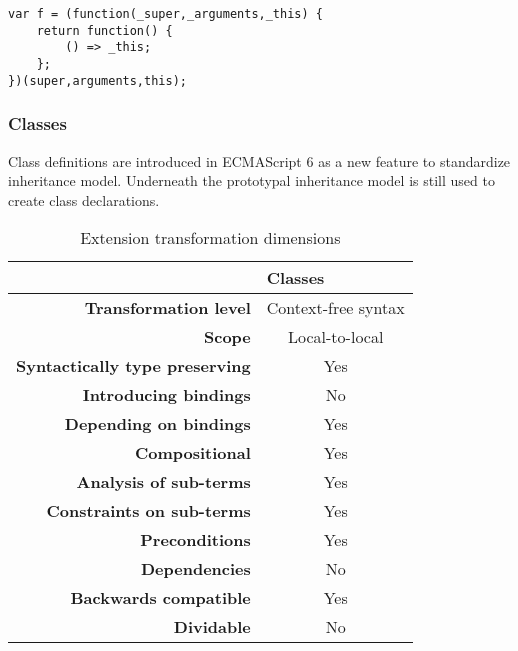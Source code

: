 \documentclass[10pt,a4paper]{article}
\begin{document}
\begin{lstlisting}[caption={Incorrect renaming of this in nested arrow function}]
var f = (function(_super,_arguments,_this) {
	return function() {	
		() => _this;
	};
})(super,arguments,this);
\end{lstlisting}

\subsubsection{Classes}
Class definitions\cite[14.5]{SpecJS} are introduced in ECMAScript 6 as a new feature to standardize inheritance model. Underneath the prototypal inheritance model is still used to create class declarations.
\begin{table}[h]
\centering
\caption{Extension transformation dimensions}
\label{classes-table}
\begin{tabular}{@{}rc@{}}
\toprule
                                       & \multicolumn{1}{l}{\textbf{Classes}} \\ \midrule
\textbf{Transformation level}          & Context-free syntax                          \\
\textbf{Scope}                         & Local-to-local                               \\
\textbf{Syntactically type preserving} & Yes                                          \\
\textbf{Introducing bindings}          & No                                          \\%
\textbf{Depending on bindings}         & Yes                                           \\
\textbf{Compositional}                 & Yes                                          \\
\textbf{Analysis of sub-terms}          & Yes                                          \\
\textbf{Constraints on sub-terms}       & Yes                                           \\
\textbf{Preconditions}                 & Yes                                          \\
\textbf{Dependencies}                  & No                                           \\
\textbf{Backwards compatible}          & Yes                                          \\
\textbf{Dividable}                     & No                                           \\ \bottomrule
\end{tabular}
\end{table}
\end{document}
